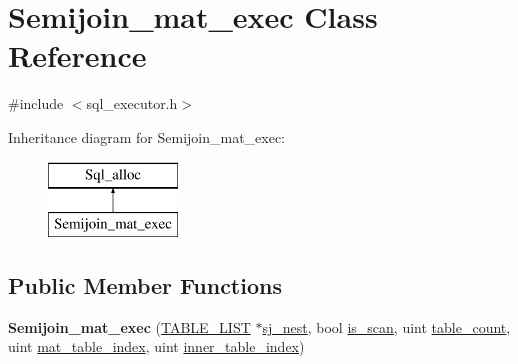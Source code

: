 \hypertarget{classSemijoin__mat__exec}{}\section{Semijoin\+\_\+mat\+\_\+exec Class Reference}
\label{classSemijoin__mat__exec}


{\ttfamily \#include $<$sql\+\_\+executor.\+h$>$}

Inheritance diagram for Semijoin\+\_\+mat\+\_\+exec\+:\begin{figure}[H]
\begin{center}
\leavevmode
\includegraphics[height=2.000000cm]{classSemijoin__mat__exec}
\end{center}
\end{figure}
\subsection*{Public Member Functions}
\begin{DoxyCompactItemize}
\item 
\mbox{\label{classSemijoin__mat__exec_a965ec656e4046983214ef5c6152a87c4}} 
{\bfseries Semijoin\+\_\+mat\+\_\+exec} (\mbox{\hyperlink{structTABLE__LIST}{T\+A\+B\+L\+E\+\_\+\+L\+I\+ST}} $\ast$\mbox{\hyperlink{classSemijoin__mat__exec_a8f658f0000b03662f190189032cda0b4}{sj\+\_\+nest}}, bool \mbox{\hyperlink{classSemijoin__mat__exec_a216db4b75a23aefee9256e0bdeddda9d}{is\+\_\+scan}}, uint \mbox{\hyperlink{classSemijoin__mat__exec_adda1225326ac660e195cb3417b8a9348}{table\+\_\+count}}, uint \mbox{\hyperlink{classSemijoin__mat__exec_a816cc5491db4c3f65592b8bf8abb1ed2}{mat\+\_\+table\+\_\+index}}, uint \mbox{\hyperlink{classSemijoin__mat__exec_a67e7548cf5367c2c2a3f5620849856cb}{inner\+\_\+table\+\_\+index}})
\end{DoxyCompactItemize}
